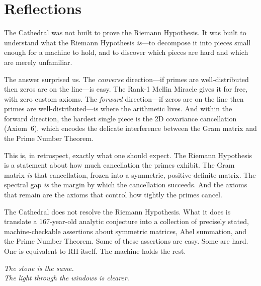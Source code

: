 \documentclass[11pt,a4paper]{article}
\theoremstyle{definition}
\begin{document}
\section{Reflections}
\label{sec:reflections}

The Cathedral was not built to prove the Riemann Hypothesis. It was built
to understand what the Riemann Hypothesis \emph{is}---to decompose it
into pieces small enough for a machine to hold, and to discover which
pieces are hard and which are merely unfamiliar.

The answer surprised us. The \emph{converse} direction---if primes are
well-distributed then zeros are on the line---is easy. The Rank-1 Mellin
Miracle gives it for free, with zero custom axioms. The \emph{forward}
direction---if zeros are on the line then primes are well-distributed---is
where the arithmetic lives. And within the forward direction, the
hardest single piece is the 2D covariance cancellation
(Axiom~6), which encodes the delicate interference between the Gram
matrix and the Prime Number Theorem.

This is, in retrospect, exactly what one should expect. The Riemann
Hypothesis is a statement about how much cancellation the primes exhibit.
The Gram matrix \emph{is} that cancellation, frozen into a symmetric,
positive-definite matrix. The spectral gap \emph{is} the margin by which
the cancellation succeeds. And the axioms that remain are the axioms
that control how tightly the primes cancel.

The Cathedral does not resolve the Riemann Hypothesis. What it does is
translate a 167-year-old analytic conjecture into a collection of
precisely stated, machine-checkable assertions about symmetric matrices,
Abel summation, and the Prime Number Theorem. Some of these assertions
are easy. Some are hard. One is equivalent to RH itself. The machine
holds the rest.

\begin{flushright}
\emph{The stone is the same.\\
The light through the windows is clearer.}
\end{flushright}
\end{document}
